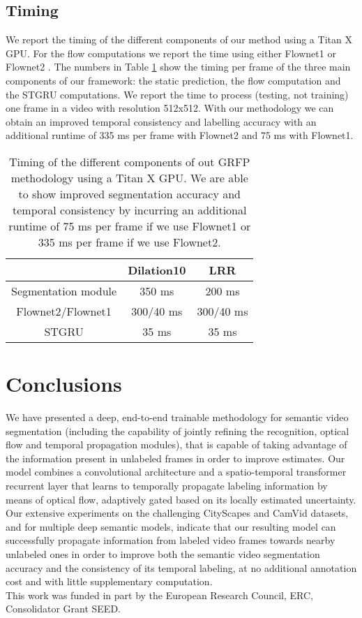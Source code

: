 \documentclass[10pt,twocolumn,letterpaper]{article}
\begin{document}
\subsection{Timing}

We report the timing of the different components of our method using a Titan X GPU. For the flow computations we report the time using either Flownet1 \cite{fischer2015flownet} or Flownet2 \cite{flownet2}. The numbers in Table \ref{tab:timing} show the timing per frame of the three main components of our framework: the static prediction, the flow computation and the STGRU computations. We report the time to process (testing, not training) one frame in a video with resolution 512x512. With our methodology we can obtain an improved temporal consistency and labelling accuracy with an additional runtime of 335 ms per frame with Flownet2 and 75 ms with Flownet1.

\begin{table}[]
    \centering
    \begin{tabular}{|c|c|c|} \hline
         & Dilation10 & LRR \\ \hline
        Segmentation module & 350 ms & 200 ms \\ 
        Flownet2/Flownet1 & 300/40 ms & 300/40 ms \\ 
        STGRU & 35 ms & 35 ms \\ \hline
    \end{tabular}
    \caption{Timing of the different components of out GRFP methodology using a Titan X GPU. We are able to show improved segmentation accuracy and temporal consistency by incurring an additional runtime of 75 ms per frame if we use Flownet1 or 335 ms per frame if we use Flownet2.}
    \label{tab:timing}
\end{table}


\section{Conclusions}
We have presented a deep, end-to-end trainable methodology for semantic video segmentation (including the capability of jointly refining the recognition, optical flow and temporal propagation modules), that is capable of taking advantage of the information present in unlabeled frames in order to improve estimates. Our model combines a convolutional architecture and a spatio-temporal transformer recurrent layer that learns to temporally propagate labeling information by means of optical flow, adaptively gated based on its locally estimated uncertainty. Our extensive experiments on the challenging CityScapes and CamVid datasets, and for multiple deep semantic models, indicate that our resulting model can successfully propagate information from labeled video frames towards nearby unlabeled ones in order to improve both the semantic video segmentation accuracy and the consistency of its temporal labeling, at no additional annotation cost and with little supplementary computation. \\


 This work was funded in part by the European Research Council, ERC, Consolidator Grant SEED.

{\small


}
\end{document}
